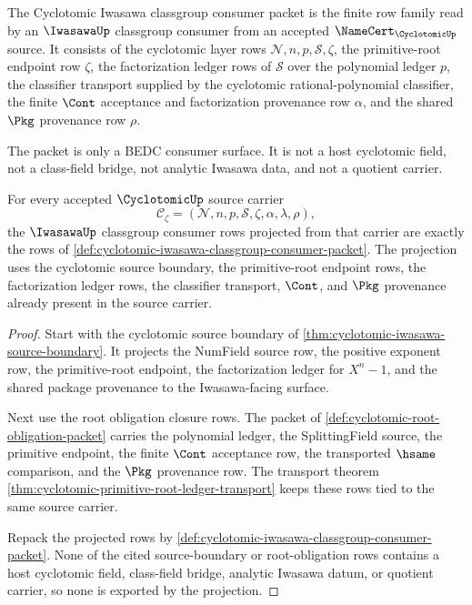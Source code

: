 \begin{definition}
\label{def:cyclotomic-iwasawa-classgroup-consumer-packet}
The Cyclotomic Iwasawa classgroup consumer packet is the finite row family
read by an $\IwasawaUp$ classgroup consumer from an accepted
$\NameCert_{\CyclotomicUp}$ source. It consists of the cyclotomic layer rows
$\mathcal N,n,p,\mathcal S,\zeta$, the primitive-root endpoint row $\zeta$,
the factorization ledger rows of $\mathcal S$ over the polynomial ledger $p$,
the classifier transport supplied by the cyclotomic rational-polynomial
classifier, the finite $\Cont$ acceptance and factorization provenance row
$\alpha$, and the shared $\Pkg$ provenance row $\rho$.

The packet is only a BEDC consumer surface. It is not a host cyclotomic field,
not a class-field bridge, not analytic Iwasawa data, and not a quotient
carrier.
\end{definition}

\begin{theorem}
\label{thm:cyclotomic-iwasawa-classgroup-consumer-projection}
For every accepted $\CyclotomicUp$ source carrier
$$
\mathcal C_{\zeta}=(\mathcal N,n,p,\mathcal S,\zeta,\alpha,\lambda,\rho),
$$
the $\IwasawaUp$ classgroup consumer rows projected from that carrier are
exactly the rows of
\autoref{def:cyclotomic-iwasawa-classgroup-consumer-packet}. The projection
uses the cyclotomic source boundary, the primitive-root endpoint rows, the
factorization ledger rows, the classifier transport, $\Cont$, and $\Pkg$
provenance already present in the source carrier.
\end{theorem}
\begin{proof}
Start with the cyclotomic source boundary of
\autoref{thm:cyclotomic-iwasawa-source-boundary}. It projects the NumField
source row, the positive exponent row, the primitive-root endpoint, the
factorization ledger for $X^n-1$, and the shared package provenance to the
Iwasawa-facing surface.

Next use the root obligation closure rows. The packet of
\autoref{def:cyclotomic-root-obligation-packet} carries the polynomial ledger,
the SplittingField source, the primitive endpoint, the finite $\Cont$
acceptance row, the transported $\hsame$ comparison, and the $\Pkg$ provenance
row. The transport theorem
\autoref{thm:cyclotomic-primitive-root-ledger-transport} keeps these rows tied
to the same source carrier.

Repack the projected rows by
\autoref{def:cyclotomic-iwasawa-classgroup-consumer-packet}. None of the cited
source-boundary or root-obligation rows contains a host cyclotomic field,
class-field bridge, analytic Iwasawa datum, or quotient carrier, so none is
exported by the projection.
\end{proof}

